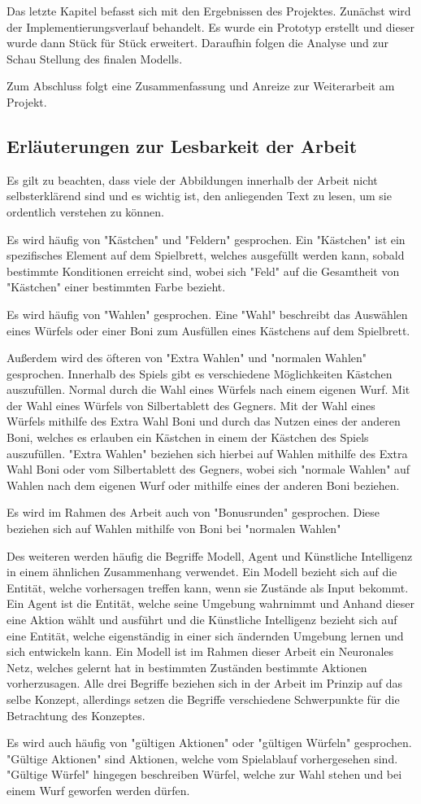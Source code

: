 Das letzte Kapitel befasst sich mit den Ergebnissen des Projektes. Zunächst wird der Implementierungsverlauf behandelt. Es wurde ein Prototyp erstellt und dieser wurde dann Stück für Stück erweitert. Daraufhin folgen die Analyse und zur Schau Stellung des finalen Modells.

Zum Abschluss folgt eine Zusammenfassung und Anreize zur Weiterarbeit am Projekt.
\subsection{Erläuterungen zur Lesbarkeit der Arbeit}
Es gilt zu beachten, dass viele der Abbildungen innerhalb der Arbeit nicht selbsterklärend sind und es wichtig ist, den anliegenden Text zu lesen, um sie ordentlich verstehen zu können. 

Es wird häufig von "Kästchen" und "Feldern" gesprochen. Ein "Kästchen" ist ein spezifisches Element auf dem Spielbrett, welches ausgefüllt werden kann, sobald bestimmte Konditionen erreicht sind, wobei sich "Feld" auf die Gesamtheit von "Kästchen" einer bestimmten Farbe bezieht.

Es wird häufig von "Wahlen" gesprochen. Eine "Wahl" beschreibt das Auswählen eines Würfels oder einer Boni zum Ausfüllen eines Kästchens auf dem Spielbrett.

Außerdem wird des öfteren von "Extra Wahlen" und "normalen Wahlen" gesprochen. Innerhalb des Spiels gibt es verschiedene Möglichkeiten Kästchen auszufüllen. Normal durch die Wahl eines Würfels nach einem eigenen Wurf. Mit der Wahl eines Würfels von Silbertablett des Gegners. Mit der Wahl eines Würfels mithilfe des Extra Wahl Boni und durch das Nutzen eines der anderen Boni, welches es erlauben ein Kästchen in einem der Kästchen des Spiels auszufüllen. "Extra Wahlen" beziehen sich hierbei auf Wahlen mithilfe des Extra Wahl Boni oder vom Silbertablett des Gegners, wobei sich "normale Wahlen" auf Wahlen nach dem eigenen Wurf oder mithilfe eines der anderen Boni beziehen.

Es wird im Rahmen des Arbeit auch von "Bonusrunden" gesprochen. Diese beziehen sich auf Wahlen mithilfe von Boni bei "normalen Wahlen"

Des weiteren werden häufig die Begriffe Modell, Agent und Künstliche Intelligenz in einem ähnlichen Zusammenhang verwendet. Ein Modell bezieht sich auf die Entität, welche vorhersagen treffen kann, wenn sie Zustände als Input bekommt. Ein Agent ist die Entität, welche seine Umgebung wahrnimmt und Anhand dieser eine Aktion wählt und ausführt und die Künstliche Intelligenz bezieht sich auf eine Entität, welche eigenständig in einer sich ändernden Umgebung lernen und sich entwickeln kann. Ein Modell ist im Rahmen dieser Arbeit ein Neuronales Netz, welches gelernt hat in bestimmten Zuständen bestimmte Aktionen vorherzusagen. Alle drei Begriffe beziehen sich in der Arbeit im Prinzip auf das selbe Konzept, allerdings setzen die Begriffe verschiedene Schwerpunkte für die Betrachtung des Konzeptes.

Es wird auch häufig von "gültigen Aktionen" oder "gültigen Würfeln" gesprochen. "Gültige Aktionen" sind Aktionen, welche vom Spielablauf vorhergesehen sind. "Gültige Würfel" hingegen beschreiben Würfel, welche zur Wahl stehen und bei einem Wurf geworfen werden dürfen.